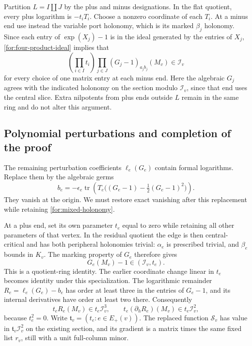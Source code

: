 Partition $L=I\amalg J$ by the plus and minus designations.  In the
flat quotient, every plus logarithm is $-t_iT_i$.  Choose a nonzero
coordinate of each $T_i$.  At a minus end use instead the variable
port holonomy, which is its marked $\beta_j$ holonomy.  Since each
entry of $\exp(X_j)-1$ is in the ideal generated by the entries of
$X_j$, \eqref{for:four-product-ideal} implies that
\begin{equation}
\label{for:mixed-holonomy}
 \left(\prod_{i\in I}t_i\right)
 \prod_{j\in J}(G_j-1)_{a_jb_j}(M_v)
                    \in\mathcal I_v
\end{equation}
for every choice of one matrix entry at each minus end.  Here the
algebraic $G_j$ agrees with the indicated holonomy on the section
modulo $\mathcal I_v$, since that end uses the central slice.  Extra
nilpotents from plus ends outside $L$ remain in the same ring and do
not alter this argument.

\subsection{Polynomial perturbations and completion of the proof}

The remaining perturbation coefficients $\ell_e(G_e)$ contain formal
logarithms.  Replace them by the algebraic germs
\begin{equation}
\label{for:polynomial-weight}
 b_e=-\epsilon_e\operatorname{tr}\left(
 T_e\bigl((G_e-1)-\tfrac12(G_e-1)^2\bigr)\right).
\end{equation}
They vanish at the origin.  We must restore exact vanishing after
this replacement while retaining \eqref{for:mixed-holonomy}.

At a plus end, set its own parameter $t_e$ equal to zero while
retaining all other parameters of that vertex.  In the residual
quotient the edge is then central-critical and has both peripheral
holonomies trivial: $\alpha_e$ is prescribed trivial, and $\beta_e$
bounds in $K_v$.  The marking property of $G_e$ therefore gives
\[
 G_e(M_v)-1\in(\mathcal I_v,t_e).
\]
This is a quotient-ring identity.  The earlier coordinate change
linear in $t_e$ becomes identity under this specialization.
The logarithmic remainder $R_e=\ell_e(G_e)-b_e$ has order at least
three in the entries of $G_e-1$, and its internal derivatives have
order at least two there.  Consequently
\begin{equation}
\label{for:replacement-estimates}
 t_eR_e(M_v)\in t_e\mathcal I_v^3,
 \qquad t_e(\partial_hR_e)(M_v)\in t_e\mathcal I_v^2,
\end{equation}
because $t_e^2=0$.  Write $\mathfrak t_v=(t_e:e\in E_+(v))$.
The replaced function $\mathcal S_v$ has value in
$\mathfrak t_v\mathcal I_v^2$ on the existing section, and its
gradient is a matrix times the same fixed list $r_v$, still with a
unit full-column minor.

